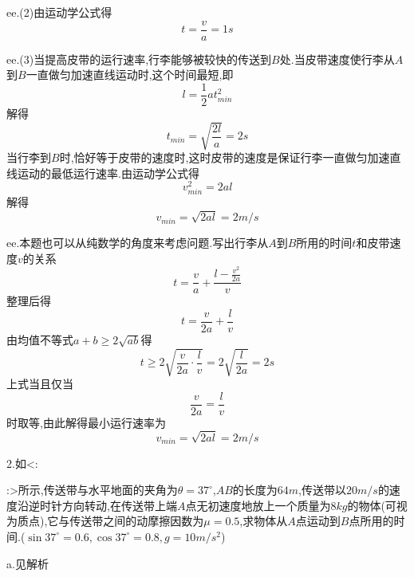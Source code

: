 \begin{calculate}
ee.(2)由运动学公式得
\[
  t=\frac{v}{a}=1s
\]

ee.(3)当提高皮带的运行速率,行李能够被较快的传送到$B$处.当皮带速度使行李从$A$到$B$一直做匀加速直线运动时,这个时间最短,即
\[
  l=\frac{1}{2}at_{min}^2
\]
解得
\[
  t_{min}=\sqrt{\frac{2l}{a}}=2s
\]
当行李到$B$时,恰好等于皮带的速度时,这时皮带的速度是保证行李一直做匀加速直线运动的最低运行速率.由运动学公式得
\[
  v_{min}^2=2al
\]
解得
\[
  v_{min}=\sqrt{2al}=2m/s
\]

ee.本题也可以从纯数学的角度来考虑问题.写出行李从$A$到$B$所用的时间$t$和皮带速度$v$的关系
\[
  t=\frac{v}{a}+\frac{l-\frac{v^2}{2a}}{v}
\]
整理后得
\[
  t=\frac{v}{2a}+\frac{l}{v}
\]
由均值不等式$a+b\geq 2\sqrt{ab}$得
\[
  t\geq 2\sqrt{\frac{v}{2a}\cdot \frac{l}{v}}=2\sqrt{\frac{l}{2a}}=2s
\]
上式当且仅当
\[
  \frac{v}{2a}=\frac{l}{v}
\]
时取等,由此解得最小运行速率为
\[
  v_{min}=\sqrt{2al}=2m/s
\]

2.如<:
:>所示,传送带与水平地面的夹角为$\theta=37^\circ$,$AB$的长度为$64m$,传送带以$20m/s$的速度沿逆时针方向转动,在传送带上端$A$点无初速度地放上一个质量为$8kg$的物体(可视为质点),它与传送带之间的动摩擦因数为$\mu=0.5$,求物体从$A$点运动到$B$点所用的时间.($\sin 37^\circ =0.6,\cos37^\circ=0.8,g=10m/s^2$)

a.见解析


\end{calculate}
